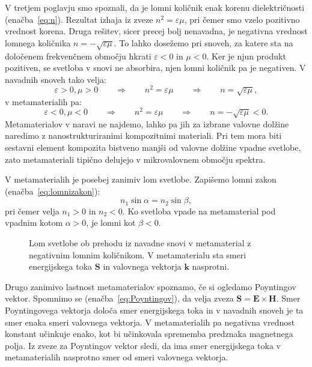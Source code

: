 V tretjem poglavju smo spoznali, da je lomni količnik enak korenu dielektričnosti
(enačba~\ref{eq:n}). Rezultat izhaja iz zveze $n^2 = \varepsilon \mu$, pri čemer smo 
vzelo pozitivno vrednost korena. Druga rešitev, sicer precej bolj nenavadna, je negativna
vrednost lomnega količnika $n = - \sqrt{\varepsilon \mu}$. To lahko dosežemo pri snoveh,
za katere sta na določenem frekvenčnem območju hkrati $\varepsilon<0$ in $\mu<0$. 
Ker je njun produkt pozitiven, se svetloba v snovi ne absorbira, njen lomni količnik 
pa je negativen. V navadnih snoveh tako velja:
\begin{equation}
\varepsilon >0, \mu > 0 \qquad \Rightarrow \qquad n^2 = \varepsilon \mu 
\qquad \Rightarrow \qquad n = \sqrt{\varepsilon\mu},
\label{eq:09_37m}
\end{equation}
v metamaterialih pa:
\begin{equation}
\varepsilon <0, \mu < 0 \qquad \Rightarrow \qquad n^2 = \varepsilon \mu 
\qquad \Rightarrow \qquad n = -\sqrt{\varepsilon\mu}<0. 
\label{eq:09_38}
\end{equation}
Metamaterialov v naravi ne najdemo, lahko pa jih za izbrane valovne dolžine naredimo z
nanostrukturiranimi kompozitnimi materiali. Pri tem mora biti sestavni element kompozita
bistveno manjši od valovne dolžine vpadne svetlobe, zato metamateriali tipično delujejo v 
mikrovalovnem območju spektra.

V metamaterialih je posebej zanimiv lom svetlobe. Zapišemo lomni zakon 
(enačba~\ref{eq:lomnizakon}):
\begin{equation}
n_1 \sin\alpha = n_2 \sin\beta,
\label{eq:09_39}
\end{equation}
pri čemer velja $n_1>0$ in $n_2<0$. Ko svetloba vpade na metamaterial pod vpadnim
kotom $\alpha>0 $, je lomni kot $\beta <0$. 
\begin{figure}[ht]
\centering
\def\svgwidth{80truemm} 

\caption{Lom svetlobe ob prehodu iz navadne snovi v metamaterial z negativnim lomnim
količnikom. V metamaterialu sta smeri energijskega toka $\mathbf{S}$ 
in valovnega vektorja $\mathbf{k}$ nasprotni.}
\label{fig:09_meta}
\end{figure}

Drugo zanimivo lastnost  metamaterialov spoznamo, če si ogledamo Poyntingov vektor. 
Spomnimo se (enačba~\ref{eq:Poyntingov}), da velja zveza 
$\mathbf{S} = \mathbf{E}\times \mathbf{H}$. Smer Poyntingovega vektorja določa smer
energijskega toka in v navadnih snoveh je ta smer enaka smeri valovnega vektorja.
V metamaterialih pa negativna vrednost konstant učinkuje enako, kot bi učinkovala
sprememba predznaka magnetnega polja. Iz zveze za Poyntingov vektor sledi, da ima
smer energijskega toka v metamaterialih nasprotno smer od smeri valovnega vektorja. 

